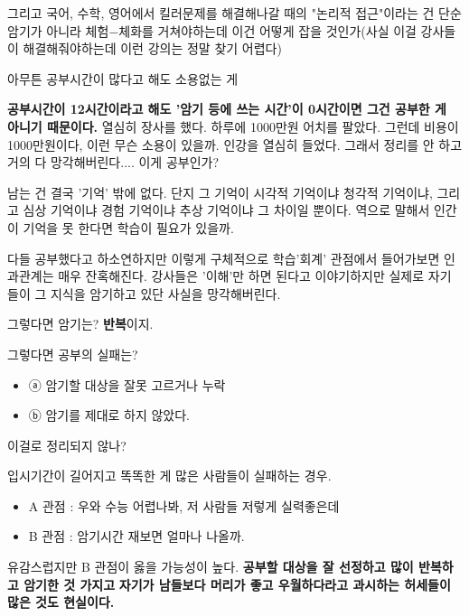 그리고 국어, 수학, 영어에서 킬러문제를 해결해나갈 때의 "논리적 접근"이라는 건 단순 암기가 아니라
체험$-$체화를 거쳐야하는데 이건 어떻게 잡을 것인가(사실 이걸 강사들이 해결해줘야하는데 이런 강의는 정말 찾기 어렵다)
\vspace{5mm}

아무튼 공부시간이 많다고 해도 소용없는 게
\vspace{5mm}

\textbf{공부시간이 12시간이라고 해도 '암기 등에 쓰는 시간'이 0시간이면 그건 공부한 게 아니기 때문이다.}
열심히 장사를 했다. 하루에 1000만원 어치를 팔았다. 그런데 비용이 1000만원이다, 이런 무슨 소용이 있을까.
인강을 열심히 들었다. 그래서 정리를 안 하고 거의 다 망각해버린다.... 이게 공부인가?
\vspace{5mm}

남는 건 결국 '기억' 밖에 없다.
단지 그 기억이 시각적 기억이냐 청각적 기억이냐,
그리고 심상 기억이냐 경험 기억이냐 추상 기억이냐 그 차이일 뿐이다.
역으로 말해서 인간이 기억을 못 한다면 학습이 필요가 있을까.
\vspace{5mm}

다들 공부했다고 하소연하지만 이렇게 구체적으로 학습'회계' 관점에서 들어가보면 인과관계는 매우 잔혹해진다.
강사들은 '이해'만 하면 된다고 이야기하지만 실제로 자기들이 그 지식을 암기하고 있단 사실을 망각해버린다.
\vspace{5mm}

그렇다면 암기는?
\textbf{반복}이지.
\vspace{5mm}

그렇다면 공부의 실패는?
\vspace{5mm}
\begin{itemize}
    \item[] ⓐ 암기할 대상을 잘못 고르거나 누락
    \item[] ⓑ 암기를 제대로 하지 않았다.
\end{itemize}
\vspace{5mm}

이걸로 정리되지 않나?
\vspace{5mm}

입시기간이 길어지고 똑똑한 게 많은 사람들이 실패하는 경우.
\begin{itemize}
    \item[] A 관점 : 우와 수능 어렵나봐, 저 사람들 저렇게 실력좋은데
    \item[] B 관점 : 암기시간 재보면 얼마나 나올까.
\end{itemize}
\vspace{5mm}

유감스럽지만 B 관점이 옳을 가능성이 높다.
\textbf{공부할 대상을 잘 선정하고 많이 반복하고 암기한 것 가지고}
\textbf{자기가 남들보다 머리가 좋고 우월하다라고 과시하는 허세들이 많은 것도 현실이다.}
\vspace{5mm}

